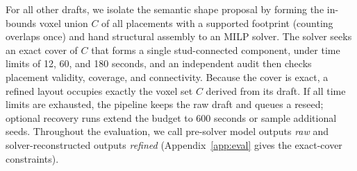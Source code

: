 For all other drafts, we isolate the semantic shape proposal by forming the in-bounds voxel union $C$ of all placements with a supported footprint (counting overlaps once) and hand structural assembly to an MILP solver. The solver seeks an exact cover of $C$ that forms a single stud-connected component, under time limits of 12, 60, and 180 seconds, and an independent audit then checks placement validity, coverage, and connectivity. Because the cover is exact, a refined layout occupies exactly the voxel set $C$ derived from its draft. If all time limits are exhausted, the pipeline keeps the raw draft and queues a reseed; optional recovery runs extend the budget to 600 seconds or sample additional seeds. Throughout the evaluation, we call pre-solver model outputs \emph{raw} and solver-reconstructed outputs \emph{refined} (Appendix~\ref{app:eval} gives the exact-cover constraints).

